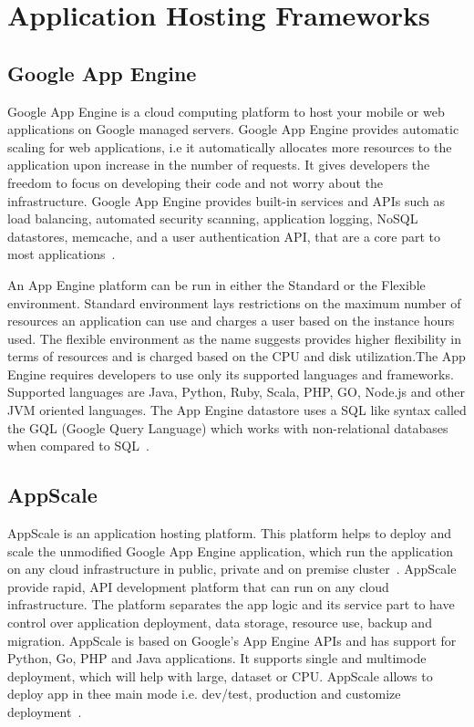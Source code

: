 \section{Application Hosting Frameworks}

\subsection{Google App Engine}

Google App Engine is a cloud computing platform to host your mobile or
web applications on Google managed servers. Google App Engine provides
automatic scaling for web applications, i.e it automatically allocates
more resources to the application upon increase in the number of
requests. It gives developers the freedom to focus on developing their
code and not worry about the infrastructure. Google App Engine
provides built-in services and APIs such as load balancing, automated
security scanning, application logging, NoSQL datastores, memcache,
and a user authentication API, that are a core part to most
applications~\cite{www-appengine-google}.
     
An App Engine platform can be run in either the Standard or the
Flexible environment. Standard environment lays restrictions on the
maximum number of resources an application can use and charges a user
based on the instance hours used. The flexible environment as the name
suggests provides higher flexibility in terms of resources and is
charged based on the CPU and disk utilization.The App Engine requires
developers to use only its supported languages and
frameworks. Supported languages are Java, Python, Ruby, Scala, PHP,
GO, Node.js and other JVM oriented languages. The App Engine datastore
uses a SQL like syntax called the GQL (Google Query Language) which
works with non-relational databases when compared to
SQL~\cite{www-wiki-appengine}.
    
\subsection{AppScale}

AppScale is an application hosting platform. This platform helps to
deploy and scale the unmodified Google App Engine application, which
run the application on any cloud infrastructure in public, private and
on premise cluster~\cite{www-appscale}. AppScale provide rapid, API
development platform that can run on any cloud infrastructure. The
platform separates the app logic and its service part to have control
over application deployment, data storage, resource use, backup and
migration.  AppScale is based on Google’s App Engine APIs and has
support for Python, Go, PHP and Java applications. It supports single
and multimode deployment, which will help with large, dataset or
CPU. AppScale allows to deploy app in thee main mode i.e. dev/test,
production and customize deployment~\cite{www-appscale-deployment}.

